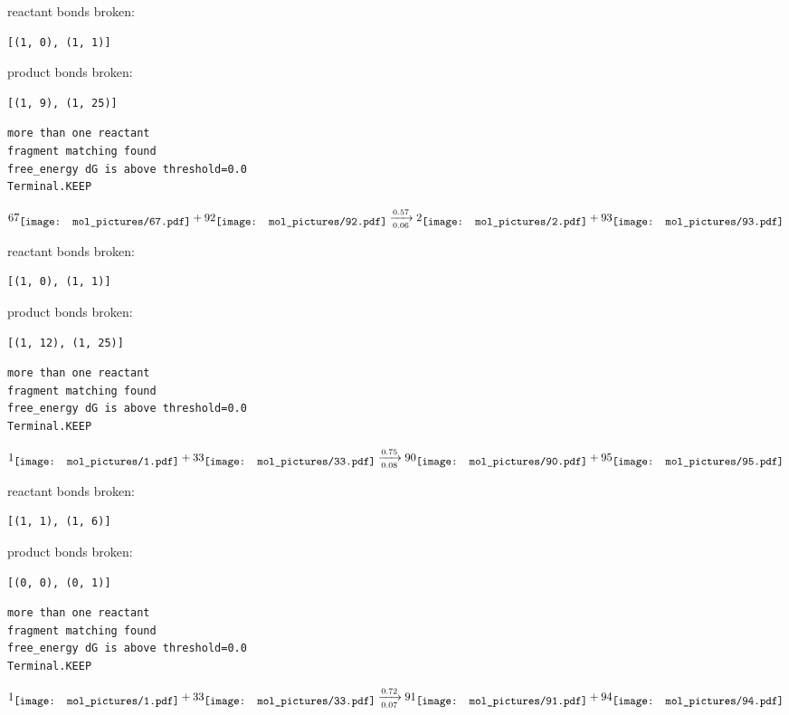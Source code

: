 \documentclass{article}
\begin{document}
reactant bonds broken:\begin{verbatim}
[(1, 0), (1, 1)]
\end{verbatim}
product bonds broken:\begin{verbatim}
[(1, 9), (1, 25)]
\end{verbatim}




\vspace{1cm}
\begin{verbatim}
more than one reactant
fragment matching found
free_energy dG is above threshold=0.0
Terminal.KEEP
\end{verbatim}
$$
67
\raisebox{-.5\height}{\texttt{[image: mol\_pictures/67.pdf]}}
+
92
\raisebox{-.5\height}{\texttt{[image: mol\_pictures/92.pdf]}}
\xrightarrow[0.06]{0.57}
2
\raisebox{-.5\height}{\texttt{[image: mol\_pictures/2.pdf]}}
+
93
\raisebox{-.5\height}{\texttt{[image: mol\_pictures/93.pdf]}}
$$


reactant bonds broken:\begin{verbatim}
[(1, 0), (1, 1)]
\end{verbatim}
product bonds broken:\begin{verbatim}
[(1, 12), (1, 25)]
\end{verbatim}




\vspace{1cm}
\begin{verbatim}
more than one reactant
fragment matching found
free_energy dG is above threshold=0.0
Terminal.KEEP
\end{verbatim}
$$
1
\raisebox{-.5\height}{\texttt{[image: mol\_pictures/1.pdf]}}
+
33
\raisebox{-.5\height}{\texttt{[image: mol\_pictures/33.pdf]}}
\xrightarrow[0.08]{0.75}
90
\raisebox{-.5\height}{\texttt{[image: mol\_pictures/90.pdf]}}
+
95
\raisebox{-.5\height}{\texttt{[image: mol\_pictures/95.pdf]}}
$$


reactant bonds broken:\begin{verbatim}
[(1, 1), (1, 6)]
\end{verbatim}
product bonds broken:\begin{verbatim}
[(0, 0), (0, 1)]
\end{verbatim}




\vspace{1cm}
\begin{verbatim}
more than one reactant
fragment matching found
free_energy dG is above threshold=0.0
Terminal.KEEP
\end{verbatim}
$$
1
\raisebox{-.5\height}{\texttt{[image: mol\_pictures/1.pdf]}}
+
33
\raisebox{-.5\height}{\texttt{[image: mol\_pictures/33.pdf]}}
\xrightarrow[0.07]{0.72}
91
\raisebox{-.5\height}{\texttt{[image: mol\_pictures/91.pdf]}}
+
94
\raisebox{-.5\height}{\texttt{[image: mol\_pictures/94.pdf]}}
$$
\end{document}
